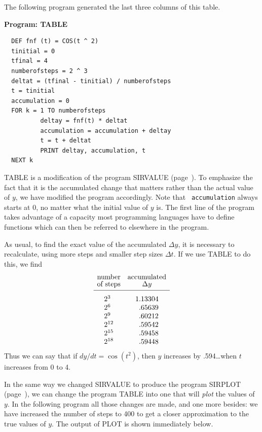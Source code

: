 The following program generated the last three columns of this
table.
\begin{center}
        {\bf Program: TABLE}\\
        \end{center}
\begin{verbatim}
  DEF fnf (t) = COS(t ^ 2)
  tinitial = 0
  tfinal = 4
  numberofsteps = 2 ^ 3
  deltat = (tfinal - tinitial) / numberofsteps
  t = tinitial
  accumulation = 0
  FOR k = 1 TO numberofsteps
          deltay = fnf(t) * deltat
          accumulation = accumulation + deltay
          t = t + deltat
          PRINT deltay, accumulation, t
  NEXT k
\end{verbatim}
TABLE is a modification of the program SIRVALUE
(page~\pageref{sirvalue}).  To emphasize the fact that it is the
accumulated change that matters rather than the actual value of $y$,
we have modified the program accordingly.  Note that {\tt
  accumulation} always starts at 0, no matter what the initial value
of $y$ is.  The first line of the program takes advantage of a
capacity most programming languages have to define functions which can
then be referred to elsewhere in the program.

As usual, to find the exact value of the accumulated $\Delta y$, it is
necessary to recalculate, using more steps and smaller step sizes
$\Delta t$.  If we use TABLE to do this, we find
        \[
\begin{array}{cc}
        \mbox{number} & \mbox{accumulated} \\[-2pt]
        \mbox{of steps} & \Delta y \\[2pt] \hline
        \rule{0pt}{15pt} 2^{3\hphantom{0}} \rule{0pt}{15pt} 
                & 1.13304 \\
        2^{6\hphantom{0}} & \hphantom{0}.65639 \\
        2^{9\hphantom{0}} & \hphantom{0}.60212 \\
        2^{12} & \hphantom{0}.59542 \\
        2^{15} & \hphantom{0}.59458 \\
        2^{18} & \hphantom{0}.59448 
        \end{array}
\] 
Thus we can say that if $dy/dt = \cos(t^2)$, then $y$ increases by
.594\ldots when $t$ increases from 0 to 4.

In the same way we changed SIRVALUE to produce the program SIRPLOT
(page~\pageref{sirplot}), we can change the program TABLE into one
that will {\em plot\/} the values of $y$.  In the following program
all those changes are made, and one more besides: we have increased
the number of steps to 400 to get a closer approximation to the true
values of $y$.  The output of PLOT is shown
immediately below.

